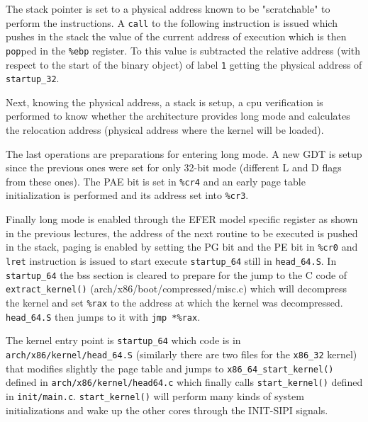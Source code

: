 \documentclass[twoside]{article}
\begin{document}
The stack pointer is set to a physical address known to be "scratchable" to perform the instructions. A \texttt{call} to the following instruction is issued which pushes in the stack the value of the current address of execution which is then \texttt{pop}ped in the \texttt{\%ebp} register. To this value is subtracted the relative address (with respect to the start of the binary object) of label \texttt{1} getting the physical address of \texttt{startup_32}.

Next, knowing the physical address, a stack is setup, a cpu verification is performed to know whether the architecture provides long mode and calculates the relocation address (physical address where the kernel will be loaded).

The last operations are preparations for entering long mode. A new GDT is setup since the previous ones were set for only 32-bit mode (different L and D flags from these ones). The PAE bit is set in \texttt{\%cr4} and an early page table initialization is performed and its address set into \texttt{\%cr3}.

Finally long mode is enabled through the EFER model specific register as shown in the previous lectures, the address of the next routine to be executed is pushed in the stack, paging is enabled by setting the PG bit and the PE bit in \texttt{\%cr0} and \texttt{lret} instruction is issued to start execute \texttt{startup_64} still in \texttt{head_64.S}. In \texttt{startup_64} the bss section is cleared to prepare for the jump to the C code of \texttt{extract_kernel()}
(arch/x86/boot/compressed/misc.c) which will decompress
the kernel and set \texttt{\%rax} to the address at which the kernel was decompressed. \texttt{head_64.S} then jumps to it with \texttt{jmp *\%rax}. 

The kernel  entry point is \texttt{startup_64} which code is in \texttt{arch/x86/kernel/head_64.S} (similarly there are two files for the \texttt{x86_32} kernel) that modifies slightly the page table and jumps to \texttt{x86_64_start_kernel()} defined in \texttt{arch/x86/kernel/head64.c} which finally calls \texttt{start_kernel()} defined in \texttt{init/main.c}. \texttt{start_kernel()} will perform many kinds of
system initializations and wake up the other cores through the INIT-SIPI signals.

\end{document}
